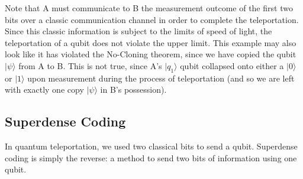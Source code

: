 \documentclass{article}
\begin{document}
    Note that A must communicate to B the measurement outcome of the first two bits over a classic communication channel in order to complete the teleportation. Since this classic information is subject to the limits of speed of light, the teleportation of a qubit does not violate the upper limit. This example may also look like it has violated the No-Cloning theorem, since we have copied the qubit $|\psi\rangle$ from A to B. This is not true, since A's $|q_1\rangle$ qubit collapsed onto either a $|0\rangle$ or $|1\rangle$ upon measurement during the process of teleportation (and so we are left with exactly one copy $|\psi\rangle$ in B's possession).


  \subsection{Superdense Coding} 

    In quantum teleportation, we used two classical bits to send a qubit. Superdense coding is simply the reverse: a method to send two bits of information using one qubit.  
\end{document}
